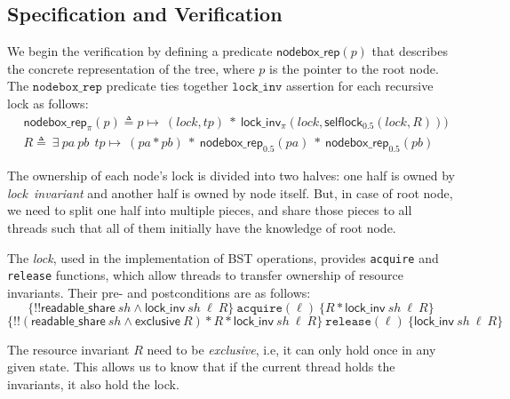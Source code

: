 \documentclass[acmsmall,screen]{acmart}\settopmatter{printfolios=true}
\begin{document}
\subsection{Specification and Verification}
We begin the verification by defining a predicate $\mathsf{nodebox\_rep}(p)$ that describes the concrete representation of the tree, where $p$ is the pointer to the root node. The $\texttt{nodebox\_rep}$ predicate ties together $\texttt{lock\_inv}$ assertion for each recursive lock as follows: 
\begin{align*}
 &\mathsf{nodebox\_rep}_{\pi}(p) \triangleq  p\mapsto\ (lock,tp)\ *\ \mathsf{lock\_inv_{\pi}}(lock, \mathsf{selflock}_{0.5}(lock,R))) \\&R  \triangleq\ \exists\ pa\ pb\ \ tp\mapsto\ (pa * pb)\ *\  \mathsf{nodebox\_rep}_{0.5}(pa)\ *\ \mathsf{nodebox\_rep}_{0.5}(pb)  \end{align*}
 
 The ownership of each node's lock is divided into two halves: one half is owned by \emph{lock\ invariant} and another half is owned by node itself. But, in case of root node, we need to split one half into multiple pieces, and share those pieces to all threads such that all of them initially have the knowledge of root node.
 
 The \emph{lock}, used in the implementation of BST operations, provides \texttt{acquire} and \texttt{release} functions, which allow threads to transfer ownership of resource invariants. Their pre- and postconditions are as follows:
$$\{!!\mathsf{readable\_share}\ \mathit{sh} \land \mathsf{lock\_inv}\ \mathit{sh}\ \ell\ R\}\ \texttt{acquire}(\ell)\ \{R * \mathsf{lock\_inv}\ \mathit{sh}\ \ell\ R\}$$
$$\{!!(\mathsf{readable\_share}\ \mathit{sh} \land \mathsf{exclusive}\ R) * R * \mathsf{lock\_inv}\ \mathit{sh}\ \ell\ R\}\ \texttt{release}(\ell)\ \{\mathsf{lock\_inv}\ \mathit{sh}\ \ell\ R\}$$


The resource invariant $R$ need to be \emph{exclusive}, i.e, it can only hold once in any given state. This allows us to know that if the current thread holds the invariants, it also hold the lock. 

    
\end{document}
